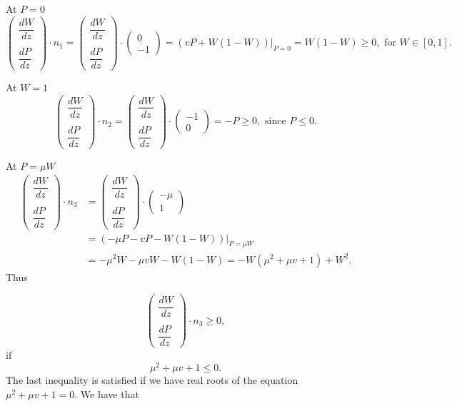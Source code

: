 \documentclass[
  letterpaper,
  DIV=11,
  numbers=noendperiod]{scrreprt}
\theoremstyle{plain}
\theoremstyle{definition}
\theoremstyle{plain}
\theoremstyle{remark}
\begin{document}
At \(P=0\) \[
\begin{pmatrix} 
\dfrac{ dW}{dz} \\  \\ \dfrac{dP}{dz}
\end{pmatrix} \cdot n_1 = \begin{pmatrix} 
\dfrac{ dW}{dz} \\  \\ \dfrac{dP}{dz}
\end{pmatrix}\cdot  \begin{pmatrix} 
0 \\ -1
\end{pmatrix} =  \left(v P + W(1-W)\right) \Big|_{P=0} =  W(1-W) \geq 0 , \text{ for } W\in [0,1].
\]

At \(W=1\) \[
\begin{pmatrix} 
\dfrac{ dW}{dz} \\  \\ \dfrac{dP}{dz}
\end{pmatrix} \cdot n_2 = \begin{pmatrix} 
\dfrac{ dW}{dz} \\  \\ \dfrac{dP}{dz}
\end{pmatrix}\cdot  \begin{pmatrix} 
-1 \\ 0
\end{pmatrix} =  -P  \geq 0 , \text{ since }P \leq 0.
\]

At \(P=\mu W\) \[
\begin{aligned}
\begin{pmatrix} 
\dfrac{ dW}{dz} \\  \\ \dfrac{dP}{dz}
\end{pmatrix} \cdot n_3 &= \begin{pmatrix} 
\dfrac{ dW}{dz} \\  \\ \dfrac{dP}{dz}
\end{pmatrix}\cdot  \begin{pmatrix} 
-\mu \\ 1
\end{pmatrix} \\
& =\left(  - \mu  P - vP -  W(1-W)\right) \Big|_{P=\mu W}  \\
&=   - \mu^2 W - \mu v W - W(1-W) = - W( \mu^2 + \mu v + 1) + W^2.
\end{aligned}
\] Thus

\[
\begin{pmatrix} 
\dfrac{ dW}{dz} \\  \\ \dfrac{dP}{dz}
\end{pmatrix} \cdot n_3 \geq 0,
\] if \[
\mu^2 + \mu v + 1 \leq 0.
\] The last inequality is satisfied if we have real roots of the
equation \(\mu^2 + \mu v + 1 = 0\). We have that
\end{document}
